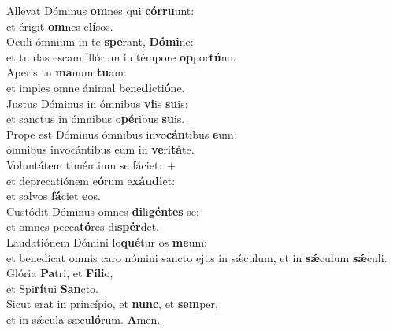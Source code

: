 \evenverse Allevat Dóminus \textbf{om}nes qui \textbf{cór}\textbf{ru}unt:~\*\\
\evenverse et érigit \textbf{om}nes e\textbf{lí}sos.\\
\oddverse Oculi ómnium in te \textbf{spe}rant, \textbf{Dó}\textbf{mi}ne:~\*\\
\oddverse et tu das escam illórum in témpore \textbf{op}por\textbf{tú}no.\\
\evenverse Aperis tu \textbf{ma}num \textbf{tu}am:~\*\\
\evenverse et imples omne ánimal bene\textbf{di}cti\textbf{ó}ne.\\
\oddverse Justus Dóminus in ómnibus \textbf{vi}is \textbf{su}is:~\*\\
\oddverse et sanctus in ómnibus o\textbf{pé}ribus \textbf{su}is.\\
\evenverse Prope est Dóminus ómnibus invo\textbf{cán}tibus \textbf{e}um:~\*\\
\evenverse ómnibus invocántibus eum in \textbf{ve}ri\textbf{tá}te.\\
\oddverse Voluntátem timéntium se fáciet:~+\\
\oddverse  et deprecatiónem e\textbf{ó}rum e\textbf{xáu}\textbf{di}et:~\*\\
\oddverse et salvos \textbf{fá}ciet \textbf{e}os.\\
\evenverse Custódit Dóminus omnes \textbf{di}li\textbf{gén}\textbf{tes} se:~\*\\
\evenverse et omnes pecca\textbf{tó}res di\textbf{spér}det.\\
\oddverse Laudatiónem Dómini lo\textbf{qué}tur os \textbf{me}um:~\*\\
\oddverse et benedícat omnis caro nómini sancto ejus in sǽculum, et in \textbf{sǽ}culum \textbf{sǽ}culi.\\
\evenverse Glória \textbf{Pa}tri, et \textbf{Fí}\textbf{li}o,~\*\\
\evenverse et Spi\textbf{rí}tui \textbf{San}cto.\\
\oddverse Sicut erat in princípio, et \textbf{nunc}, et \textbf{sem}per,~\*\\
\oddverse et in sǽcula sæcu\textbf{ló}rum. \textbf{A}men.\\
